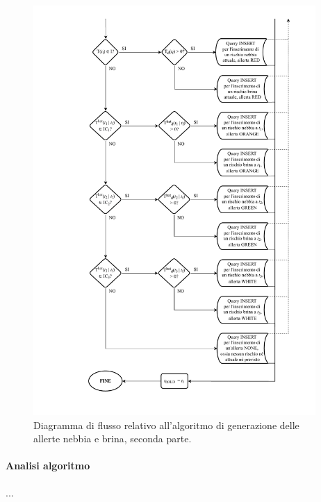 \begin{figure}[h!]
	\centering
	\includegraphics[height=590px]{./Iterazione 3/OtherFiles/FC - Generatore allerte F&F(2).pdf}
	\caption{Diagramma di flusso relativo all'algoritmo di generazione delle allerte nebbia e brina, seconda parte.}
	\label{fig:FFFlowChart2}
\end{figure}

\clearpage

\paragraph{Analisi algoritmo}...

